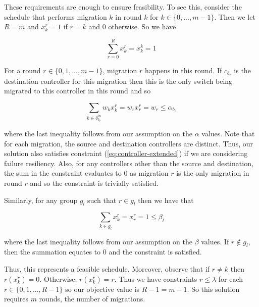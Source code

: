 \documentclass[letterpaper,12pt,titlepage,oneside,final]{article}
\begin{document}
These requirements are enough to ensure feasibility. To see this, consider the schedule that performs migration $k$ in round $k$ for $k \in \{0, ..., m - 1\}$. Then we let $R = m$ and $x^{r}_{k} = 1$ if $r = k$ and 0 otherwise. So we have

$$\sum_{r=0}^{R} x^{r}_{k} = x^{k}_{k} = 1$$

For a round $r \in \{0, 1, ..., m - 1\}$, migration $r$ happens in this round. If $c_{b_{r}}$ is the destination controller for this migration then this is the only switch being migrated to this controller in this round and
so

$$\sum_{k \in \delta^{in}_{b_{r}}} w_{k}x^{r}_{k} = w_{r}x^{r}_{r} = w_{r} \leq \alpha_{b_{r}}$$

where the last inequality follows from our assumption on the $\alpha$ values. Note that for each migration, the source and destination controllers are distinct. Thus, our solution also satisfies constraint (\ref{eq:controller-extended}) if we are considering failure resiliency. Also, for any controllers other than the source and destination, the sum in the constraint evaluates to 0 as migration $r$ is the only migration in round $r$ and so the constraint is trivially satisfied.

Similarly, for any group $g_{l}$ such that $r \in g_{l}$ then we have that

$$\sum_{k \in g_{l}} x^{r}_{k} = x^{r}_{r} = 1 \leq \beta_{l}$$

where the last inequality follows from our assumption on the $\beta$ values. If $r \notin g_{l}$, then the summation equates to 0 and the constraint is satisfied. 

Thus, this represents a feasible schedule. Moreover, observe that if $r \neq k$ then $r(x^{r}_{k}) = 0$. Otherwise, $r(x^{r}_{k}) = r$. Thus we have constraints $r \leq \lambda$ for each $r \in \{0, 1, ..., R - 1\}$ so our objective value is $R - 1 = m - 1$. So this solution requires $m$ rounds, the number of migrations.
 
\newpage



\end{document}
